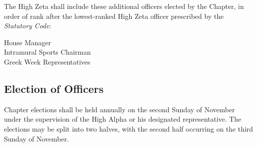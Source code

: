 \documentclass{article}
\begin{document}
The High Zeta shall include these additional officers elected by the Chapter, in
order of rank after the lowest-ranked High Zeta officer prescribed by the
\emph{Statutory Code}:

House Manager\\
Intramural Sports Chairman\\
Greek Week Representatives

\subsection{Election of Officers}

Chapter elections shall be held annually on the second Sunday of November under
the supervision of the High Alpha or his designated representative. The
elections may be split into two halves, with the second half occurring on the
third Sunday of November.
\end{document}
